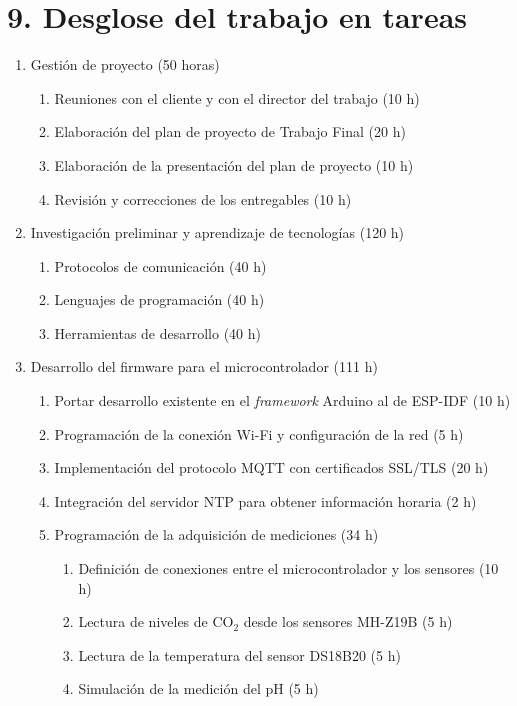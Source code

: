 \documentclass[
11pt, %
]{charter}
\begin{document}
\section{9. Desglose del trabajo en tareas}
\label{sec:wbs}
\begin{enumerate}
	\item Gestión de proyecto (50 horas)
	\begin{enumerate}
		\item Reuniones con el cliente y con el director del trabajo (10 h)
		\item Elaboración del plan de proyecto de Trabajo Final (20 h)
		\item Elaboración de la presentación del plan de proyecto (10 h)
		\item Revisión y correcciones de los entregables (10 h)
	\end{enumerate}
	\item Investigación preliminar y aprendizaje de tecnologías (120 h)
	\begin{enumerate}
		\item Protocolos de comunicación (40 h)
		\item Lenguajes de programación (40 h)
		\item Herramientas de desarrollo (40 h)
	\end{enumerate}
		\item Desarrollo del firmware para el microcontrolador (111 h)
	\begin{enumerate}
		\item Portar desarrollo existente en el \textit{framework} Arduino al de ESP-IDF (10 h)
		\item Programación de la conexión Wi-Fi y configuración de la red (5 h)
		\item Implementación del protocolo MQTT con certificados SSL/TLS (20 h)
		\item Integración del servidor NTP para obtener información horaria (2 h)
		\item Programación de la adquisición de mediciones (34 h)
		\begin{enumerate}[label*=\arabic*.,ref=\theenumii.\arabic*]
			\item Definición de conexiones entre el microcontrolador y los sensores (10 h)
			\item Lectura de niveles de CO$_2$ desde los sensores MH-Z19B (5 h)
			\item Lectura de la temperatura del sensor DS18B20 (5 h)
			\item Simulación de la medición del pH (5 h)

\end{enumerate}
\end{enumerate}
\end{enumerate}
\end{document}

